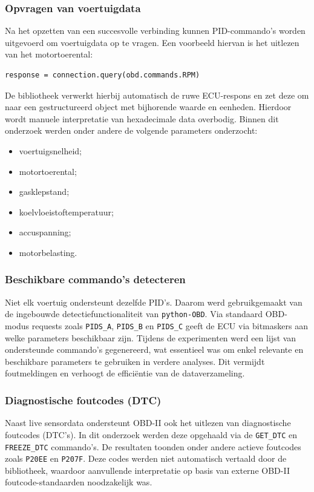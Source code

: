 \subsubsection{Opvragen van voertuigdata}
Na het opzetten van een succesvolle verbinding kunnen PID-commando's worden uitgevoerd om voertuigdata op te vragen. Een voorbeeld hiervan is het uitlezen van het motortoerental:

\begin{verbatim}
response = connection.query(obd.commands.RPM)
\end{verbatim}

De bibliotheek verwerkt hierbij automatisch de ruwe ECU-respons en zet deze om naar een gestructureerd object met bijhorende waarde en eenheden. Hierdoor wordt manuele interpretatie van hexadecimale data overbodig.
Binnen dit onderzoek werden onder andere de volgende parameters onderzocht:
\begin{itemize}
    \item voertuigsnelheid;
    \item motortoerental;
    \item gasklepstand;
    \item koelvloeistoftemperatuur;
    \item accuspanning;
    \item motorbelasting.
\end{itemize}

\subsubsection{Beschikbare commando's detecteren}
Niet elk voertuig ondersteunt dezelfde PID's. Daarom werd gebruikgemaakt van de ingebouwde detectiefunctionaliteit van \texttt{python-OBD}. Via standaard OBD-modus requests zoals \texttt{PIDS\_A}, \texttt{PIDS\_B} en \texttt{PIDS\_C} geeft de ECU via bitmaskers aan welke parameters beschikbaar zijn.
Tijdens de experimenten werd een lijst van ondersteunde commando's gegenereerd, wat essentieel was om enkel relevante en beschikbare parameters te gebruiken in verdere analyses. Dit vermijdt foutmeldingen en verhoogt de efficiëntie van de dataverzameling.

\subsubsection{Diagnostische foutcodes (DTC)}
Naast live sensordata ondersteunt OBD-II ook het uitlezen van diagnostische foutcodes (DTC’s). In dit onderzoek werden deze opgehaald via de \texttt{GET\_DTC} en \texttt{FREEZE\_DTC} commando's.
De resultaten toonden onder andere actieve foutcodes zoals \texttt{P20EE} en \texttt{P207F}. Deze codes werden niet automatisch vertaald door de bibliotheek, waardoor aanvullende interpretatie op basis van externe OBD-II foutcode-standaarden noodzakelijk was.

